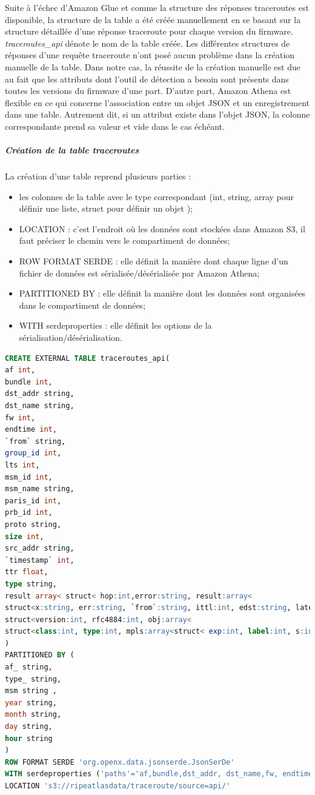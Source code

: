 Suite à l'échec d'Amazon Glue  et comme la structure des réponses traceroutes est disponible,  la structure de la table a été créée   manuellement en se basant sur la structure détaillée d'une réponse traceroute pour chaque version du firmware. \textit{traceroutes\_api} dénote le nom de la table créée. Les différentes structures de réponses d'une requête traceroute n'ont posé aucun problème dans la création manuelle de la table. Dans notre cas, la réussite de la création manuelle est due au fait que les attributs dont l'outil de détection a besoin sont présents dans toutes les versions du firmware d'une part. D'autre part, Amazon Athena est flexible en ce qui concerne l'association entre un objet JSON et un enregistrement dans une table. Autrement dit, si un attribut existe dans l'objet JSON, la colonne correspondante prend sa valeur et vide dans le cas échéant.  

\subparagraph{Création de la table traceroutes } 
La création d'une table reprend plusieurs parties :
\begin{itemize}
	\item les colonnes de la table avec le type correspondant (int, string, array pour définir une liste, struct pour définir un objet );
	\item LOCATION : c'est l'endroit où les données sont stockées dans Amazon S3, il faut préciser le chemin vers le compartiment de données;
	\item ROW FORMAT SERDE : elle définit la manière dont chaque ligne d'un fichier de données est sérialisée/désérialisée par Amazon Athena;
	\item PARTITIONED BY : elle définit la manière dont les données sont organisées dans le compartiment de données; 
	\item WITH serdeproperties : elle définit les options de la sérialisation/désérialisation.
\end{itemize}
\begin{lstlisting}[language=SQL, basicstyle=\footnotesize, label=createAthenaTable, caption={Création de la table des traceroutes dans Amazon Athena }]
CREATE EXTERNAL TABLE traceroutes_api(
af int,
bundle int,
dst_addr string,
dst_name string,
fw int,
endtime int,
`from` string,
group_id int,
lts int,
msm_id int,
msm_name string,
paris_id int,
prb_id int,
proto string,
size int,
src_addr string,
`timestamp` int,
ttr float,
type string,
result array< struct< hop:int,error:string, result:array<
struct<x:string, err:string, `from`:string, ittl:int, edst:string, late:int, mtu:int, rtt:float, size:int, ttl:int , flags:string, dstoptsize:int, hbhoptsize:int, icmpext:
struct<version:int, rfc4884:int, obj:array< 
struct<class:int, type:int, mpls:array<struct< exp:int, label:int, s:int, ttl:int>>>>>>>>> 
)
PARTITIONED BY (
af_ string,
type_ string,
msm string ,
year string,
month string,
day string,
hour string
) 
ROW FORMAT SERDE 'org.openx.data.jsonserde.JsonSerDe'
WITH serdeproperties ('paths'='af,bundle,dst_addr, dst_name,fw, endtime, from, lts, msm_id, paris_id, prb_id, proto, size, src_addr, timestamp, type,fw, msm_name' ) 
LOCATION 's3://ripeatlasdata/traceroute/source=api/'
\end{lstlisting}





